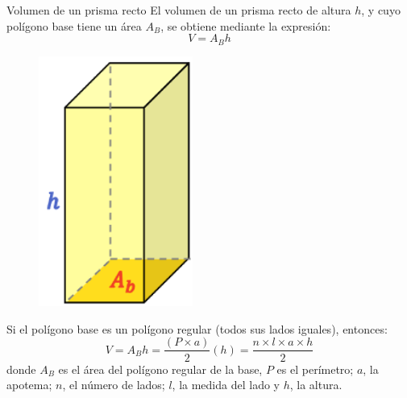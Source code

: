 
\begin{infocard}{Volumen de un prisma recto}
    El volumen de un prisma recto de altura $h$, y cuyo polígono base tiene un área $A_B$, se obtiene mediante la expresión:
    \[
        V = A_B h
    \]
    \begin{figure}[H]
        \centering
        \includegraphics[width=0.45\textwidth]{../images/20230319192423}
        \caption{}
        \label{fig:20230319192423}
    \end{figure}
    
    Si el polígono base es un polígono regular (todos sus lados iguales), entonces:
    \[
        V = A_B h = \dfrac{\left( P \times a \right)}{2} (h) = \dfrac{n \times l \times a \times h}{2}
    \]
    donde $A_B$ es el área del polígono regular de la base, $P$ es el perímetro; $a$, la apotema; $n$, el número de
    lados; $l$, la medida del lado y $h$, la altura.
\end{infocard}



